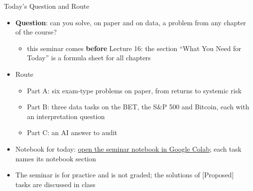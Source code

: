\begin{frame}{Today's Question and Route}
\itemsize{\small}
\begin{itemize}
    \item \textbf{Question}: can you solve, on paper and on data, a problem from any chapter of the course?
    \begin{itemize}
        \item this seminar comes \textbf{before} Lecture 16: the section ``What You Need for Today'' is a formula sheet for all chapters
    \end{itemize}
    \item Route
    \begin{itemize}
        \item Part A: six exam-type problems on paper, from returns to systemic risk
        \item Part B: three data tasks on the BET, the S\&P 500 and Bitcoin, each with an interpretation question
        \item Part C: an AI answer to audit
    \end{itemize}
    \item Notebook for today: \href{\nb}{open the seminar notebook in Google Colab}; each task names its notebook section
    \item The seminar is for practice and is not graded; the solutions of [Proposed] tasks are discussed in class
\end{itemize}
\end{frame}

